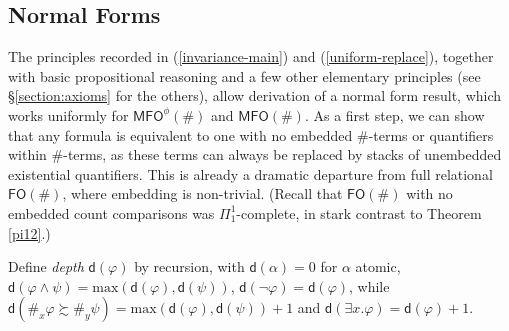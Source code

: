 \documentclass[12pt,oneside,reqno]{amsart}
\theoremstyle{definition}
\begin{document}

\subsection{Normal Forms} \label{section:normalform}
The principles recorded in (\ref{invariance-main}) and (\ref{uniform-replace}), together with basic propositional reasoning and a few other elementary principles (see \S\ref{section:axioms} for the others), allow derivation of a normal form result, which works uniformly for $\mathsf{MFO}^\phi(\#)$ and $\mathsf{MFO}(\#)$. As a first step, we can show that any formula is equivalent to one with no embedded $\#$-terms or quantifiers within $\#$-terms, as these terms can always be replaced by stacks of unembedded existential quantifiers. This is already a dramatic departure from full relational $\mathsf{FO}(\#)$, where embedding is non-trivial. (Recall that $\mathsf{FO}(\#)$ with no embedded count comparisons was $\Pi^1_1$-complete, in stark contrast to Theorem \ref{pi12}.)

Define \emph{depth} $\mathsf{d}(\varphi)$ by recursion, with $\mathsf{d}(\alpha) = 0$ for $\alpha$ atomic, $\mathsf{d}(\varphi \wedge \psi) = \mbox{max}(\mathsf{d}(\varphi),\mathsf{d}(\psi))$, $\mathsf{d}(\neg \varphi) = \mathsf{d}(\varphi)$, while $\mathsf{d}(\#_x\varphi \succsim \#_y\psi) = \mbox{max}(\mathsf{d}(\varphi),\mathsf{d}(\psi))+1$ and $\mathsf{d}(\exists x. \varphi) =\mathsf{d}(\varphi)+1$.

\vspace{1ex}
\end{document}
